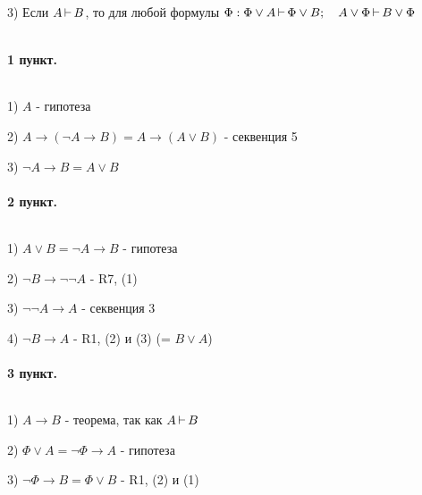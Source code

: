 3) Если  $A \operatorname{\vdash} B$, то для любой формулы  $\Phi: \Phi \lor A \operatorname{\vdash} \Phi \lor B; \quad 
A \lor \Phi \operatorname{\vdash} B \lor \Phi$
\begin{myproof}
${}$
\paragraph*{1 пункт.} ${}$ \newline

1) $A$ - гипотеза

2)  $A \to (\lnot A \to B) = A \to (A \lor B)$ - секвенция 5

3) $\lnot A \to B = A \lor B$

\paragraph*{2 пункт.} ${}$ \newline

1) $A \lor B = \lnot A \to B$ - гипотеза

2) $\lnot B \to \lnot\lnot A$ - R7, (1)

3) $\lnot\lnot A \to A$ - секвенция 3

4) $\lnot B \to A$ - R1, (2) и (3) (= $B \lor A$)

\paragraph*{3 пункт.} ${}$ \newline

1) $A \to B$ - теорема, так как  $A \operatorname{\vdash} B$ 

2) $\Phi \lor A = \lnot \Phi \to A$ - гипотеза

3) $\lnot\Phi \to B = \Phi \lor B$ - R1, (2) и (1)

\end{myproof}




